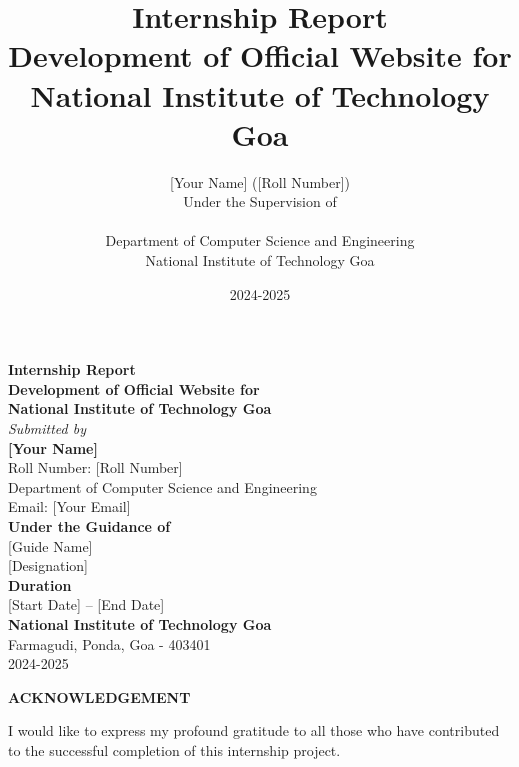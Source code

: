 \documentclass[12pt,a4paper]{report}
\title{Internship Report\\[1em]
\Large Development of Official Website for National Institute of Technology Goa}
\author{[Your Name] ([Roll Number])\\[1em]
Under the Supervision of\\
[Guide Name]\\[2em]
Department of Computer Science and Engineering\\
National Institute of Technology Goa}
\date{2024-2025}
\begin{document}
\begin{titlepage}
\centering

\vspace*{0.5cm}


{\Huge\bfseries Internship Report}\\[1.5cm]

{\Large\bfseries Development of Official Website for}\\[0.3cm]
{\Large\bfseries National Institute of Technology Goa}\\[2cm]

{\Large\textit{Submitted by}}\\[0.3cm]
{\Large\bfseries [Your Name]}\\[0.2cm]
{\Large Roll Number: [Roll Number]}\\[0.2cm]
{\Large Department of Computer Science and Engineering}\\[0.2cm]
{\Large Email: [Your Email]}\\[1.5cm]

{\Large\bfseries Under the Guidance of}\\[0.3cm]
{\Large [Guide Name]}\\[0.2cm]
{\Large [Designation]}\\[2cm]

{\Large\bfseries Duration}\\[0.3cm]
{\Large [Start Date] -- [End Date]}\\[1.5cm]

{\Large\bfseries National Institute of Technology Goa}\\[0.3cm]
{\Large Farmagudi, Ponda, Goa - 403401}\\[1cm]

{\Large 2024-2025}

\vfill

\end{titlepage}

\newpage
\thispagestyle{empty}
\begin{center}
{\LARGE\bfseries ACKNOWLEDGEMENT}\\[2cm]
\end{center}

I would like to express my profound gratitude to all those who have contributed to the successful completion of this internship project.
\end{document}

